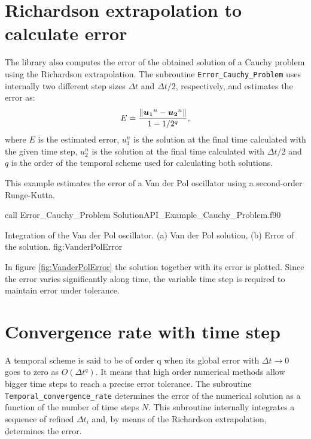  
 \FloatBarrier
 
 
   
      
           
           
           
           
 
 \newpage    
 \section{Richardson extrapolation to calculate error}
   
  The library also computes the error of the obtained solution of a Cauchy problem using the Richardson extrapolation. 
     The subroutine \verb|Error_Cauchy_Problem|
      uses internally two different  step sizes  $\Delta t$ and $\Delta t/2$, respectively, and estimates the error as:
     \begin{align*}
     	    E = \frac{\norm{ \boldsymbol{u_1}^{n} - \boldsymbol{u_2}^{n} }}{1-1 /2^{q}},
     \end{align*}
     where $E$ is the estimated error, $u_1^n$ is the solution at the final time calculated with the given time step, $u_2^n$ is the solution at the final time calculated with $ \Delta t /2 $ and $q$ is the order of the temporal scheme used for calculating both solutions.
     
     This example estimates the error of a Van der Pol oscillator using a second-order Runge-Kutta.
     
     
     \vspace{0.5cm} 
      {call Error_Cauchy_Problem}
      {Solution}{API_Example_Cauchy_Problem.f90}
     
      \twographs{}
                {}
                {Integration of the Van der Pol oscillator.
                 (a) Van der Pol solution,
                 (b) Error of the solution. }
                 {fig:VanderPolError} 
   
   
   In figure \ref{fig:VanderPolError} the solution together with its error is plotted. Since the error varies significantly along  time, the variable  time step is required to maintain error under tolerance.
  
  \newpage                
  \section{Convergence rate with time step}
   A temporal scheme is said to be of order q when its global error with $\Delta t \rightarrow 0 $ goes to zero as $ O( \Delta t^q )$. 
     It means that high order numerical methods allow bigger time steps to reach a precise error tolerance. 
     The subroutine \verb|Temporal_convergence_rate| determines the error of the numerical solution as a function of the number of time steps $ N $. This subroutine internally integrates a sequence of refined $ \Delta t_i $ and, by means of the Richardson extrapolation, determines the error.  
     
